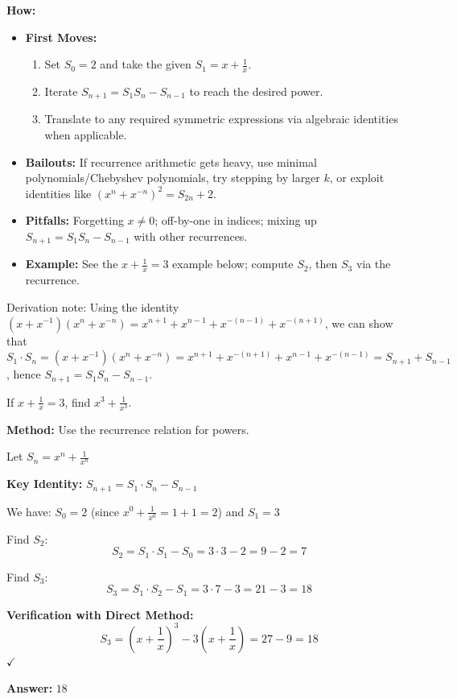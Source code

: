 \documentclass[12pt]{article}
\newenvironment{problem}[1]
{\begin{tcolorbox}[colback=blue!5!white,colframe=blue!75!black,title={#1}]}{\end{tcolorbox}}
\newenvironment{solution}
{\begin{tcolorbox}[colback=green!5!white,colframe=green!75!black,title={Solution}]}{\end{tcolorbox}}
\begin{document}
\textbf{How:}
\begin{itemize}
    \item \textbf{First Moves:}
    \begin{enumerate}[nosep]
        \item Set $S_0=2$ and take the given $S_1=x+\tfrac{1}{x}$.
        \item Iterate $S_{n+1}=S_1S_n-S_{n-1}$ to reach the desired power.
        \item Translate to any required symmetric expressions via algebraic identities when applicable.
    \end{enumerate}
    \item \textbf{Bailouts:} If recurrence arithmetic gets heavy, use minimal polynomials/Chebyshev polynomials, try stepping by larger $k$, or exploit identities like $(x^n+x^{-n})^2=S_{2n}+2$.
    \item \textbf{Pitfalls:} Forgetting $x\ne 0$; off-by-one in indices; mixing up $S_{n+1}=S_1S_n-S_{n-1}$ with other recurrences.
    \item \textbf{Example:} See the $x+\tfrac{1}{x}=3$ example below; compute $S_2$, then $S_3$ via the recurrence.
\end{itemize}

Derivation note: Using the identity $(x + x^{-1})(x^n + x^{-n}) = x^{n+1} + x^{n-1} + x^{-(n-1)} + x^{-(n+1)}$, we can show that $S_1 \cdot S_n = (x + x^{-1})(x^n + x^{-n}) = x^{n+1} + x^{-(n+1)} + x^{n-1} + x^{-(n-1)} = S_{n+1} + S_{n-1}$, hence $S_{n+1} = S_1S_n - S_{n-1}$.

\begin{problem}{AMC 12A 2018, Problem 17}
If $x + \frac{1}{x} = 3$, find $x^3 + \frac{1}{x^3}$.
\end{problem}

\begin{solution}
\textbf{Method:} Use the recurrence relation for powers.

Let $S_n = x^n + \frac{1}{x^n}$

\textbf{Key Identity:} $S_{n+1} = S_1 \cdot S_n - S_{n-1}$

We have: $S_0 = 2$ (since $x^0 + \frac{1}{x^0} = 1 + 1 = 2$) and $S_1 = 3$

Find $S_2$:
$$S_2 = S_1 \cdot S_1 - S_0 = 3 \cdot 3 - 2 = 9 - 2 = 7$$

Find $S_3$:
$$S_3 = S_1 \cdot S_2 - S_1 = 3 \cdot 7 - 3 = 21 - 3 = 18$$

\textbf{Verification with Direct Method:}
$$S_3 = \left(x + \frac{1}{x}\right)^3 - 3\left(x + \frac{1}{x}\right) = 27 - 9 = 18$$ $\checkmark$

\textbf{Answer:} $18$
\end{solution}
\end{document}
